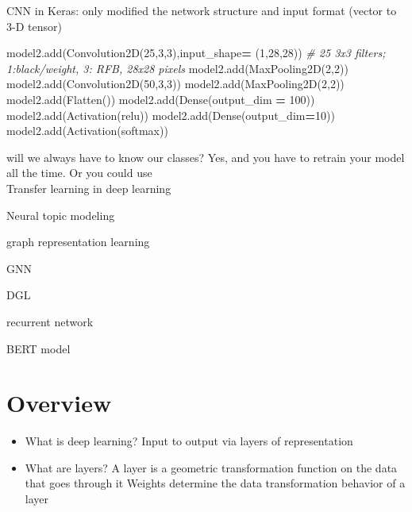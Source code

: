 \documentclass[
]{book}
\newenvironment{Shaded}{\begin{snugshade}}{\end{snugshade}}
\newcommand{\CommentTok}[1]{\textcolor[rgb]{0.56,0.35,0.01}{\textit{#1}}}
\newcommand{\DecValTok}[1]{\textcolor[rgb]{0.00,0.00,0.81}{#1}}
\newcommand{\NormalTok}[1]{#1}
\newcommand{\OperatorTok}[1]{\textcolor[rgb]{0.81,0.36,0.00}{\textbf{#1}}}
\newcommand{\StringTok}[1]{\textcolor[rgb]{0.31,0.60,0.02}{#1}}
\begin{document}
CNN in Keras: only modified the network structure and input format (vector to 3-D tensor)

\begin{Shaded}
\begin{Highlighting}[]
\NormalTok{model2.add(Convolution2D(}\DecValTok{25}\NormalTok{,}\DecValTok{3}\NormalTok{,}\DecValTok{3}\NormalTok{),input\_shape}\OperatorTok{=}\NormalTok{ (}\DecValTok{1}\NormalTok{,}\DecValTok{28}\NormalTok{,}\DecValTok{28}\NormalTok{)) }
\CommentTok{\# 25 3x3 filters; 1:black/weight, 3: RFB, 28x28 pixels}
\NormalTok{model2.add(MaxPooling2D(}\DecValTok{2}\NormalTok{,}\DecValTok{2}\NormalTok{))}
\NormalTok{model2.add(Convolution2D(}\DecValTok{50}\NormalTok{,}\DecValTok{3}\NormalTok{,}\DecValTok{3}\NormalTok{))}
\NormalTok{model2.add(MaxPooling2D(}\DecValTok{2}\NormalTok{,}\DecValTok{2}\NormalTok{))}
\NormalTok{model2.add(Flatten())}
\NormalTok{model2.add(Dense(output\_dim }\OperatorTok{=} \DecValTok{100}\NormalTok{))}
\NormalTok{model2.add(Activation(}\StringTok{\textquotesingle{}relu\textquotesingle{}}\NormalTok{))}
\NormalTok{model2.add(Dense(output\_dim}\OperatorTok{=}\DecValTok{10}\NormalTok{))}
\NormalTok{model2.add(Activation(}\StringTok{\textquotesingle{}softmax\textquotesingle{}}\NormalTok{))}
\end{Highlighting}
\end{Shaded}

will we always have to know our classes? Yes, and you have to retrain your model all the time. Or you could use\\
Transfer learning in deep learning

Neural topic modeling

graph representation learning

GNN

DGL

recurrent network

BERT model

\hypertarget{overview}{%
\chapter{Overview}\label{overview}}

\begin{itemize}
\item
  What is deep learning? Input to output via layers of representation
\item
  What are layers? A layer is a geometric transformation function on the data that goes through it Weights determine the data transformation behavior of a layer
\end{itemize}
\end{document}
